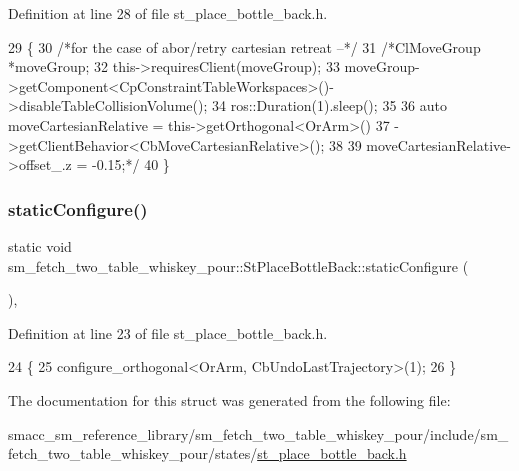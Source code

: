 Definition at line 28 of file st\+\_\+place\+\_\+bottle\+\_\+back.\+h.


\begin{DoxyCode}
29         \{
30             \textcolor{comment}{/*for the case of abor/retry cartesian retreat --*/}
31             \textcolor{comment}{/*ClMoveGroup *moveGroup;}
32 \textcolor{comment}{            this->requiresClient(moveGroup);}
33 \textcolor{comment}{            moveGroup->getComponent<CpConstraintTableWorkspaces>()->disableTableCollisionVolume();}
34 \textcolor{comment}{            ros::Duration(1).sleep();}
35 \textcolor{comment}{}
36 \textcolor{comment}{            auto moveCartesianRelative = this->getOrthogonal<OrArm>()}
37 \textcolor{comment}{                                             ->getClientBehavior<CbMoveCartesianRelative>();}
38 \textcolor{comment}{}
39 \textcolor{comment}{            moveCartesianRelative->offset\_.z = -0.15;*/}
40         \}
\end{DoxyCode}
\mbox{\label{structsm__fetch__two__table__whiskey__pour_1_1StPlaceBottleBack_a1b0db1da101544849f0fc73d5090e6e3}} 
\subsubsection{\texorpdfstring{static\+Configure()}{staticConfigure()}}
{\footnotesize\ttfamily static void sm\+\_\+fetch\+\_\+two\+\_\+table\+\_\+whiskey\+\_\+pour\+::\+St\+Place\+Bottle\+Back\+::static\+Configure (\begin{DoxyParamCaption}{ }\end{DoxyParamCaption})\hspace{0.3cm}{\ttfamily [inline]}, {\ttfamily [static]}}



Definition at line 23 of file st\+\_\+place\+\_\+bottle\+\_\+back.\+h.


\begin{DoxyCode}
24         \{
25             configure\_orthogonal<OrArm, CbUndoLastTrajectory>(1);
26         \}
\end{DoxyCode}


The documentation for this struct was generated from the following file\+:\begin{DoxyCompactItemize}
\item 
smacc\+\_\+sm\+\_\+reference\+\_\+library/sm\+\_\+fetch\+\_\+two\+\_\+table\+\_\+whiskey\+\_\+pour/include/sm\+\_\+fetch\+\_\+two\+\_\+table\+\_\+whiskey\+\_\+pour/states/\hyperlink{st__place__bottle__back_8h}{st\+\_\+place\+\_\+bottle\+\_\+back.\+h}\end{DoxyCompactItemize}
